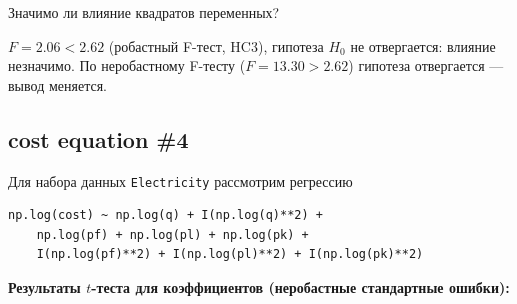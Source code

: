 \documentclass[
  russian,
]{article}
\begin{document}
Значимо ли влияние квадратов переменных?

\begin{tcolorbox}[enhanced jigsaw, arc=.35mm, bottomrule=.15mm, bottomtitle=1mm, breakable, colback=white, colbacktitle=quarto-callout-tip-color!10!white, colframe=quarto-callout-tip-color-frame, coltitle=black, left=2mm, leftrule=.75mm, opacityback=0, opacitybacktitle=0.6, rightrule=.15mm, title=\textcolor{quarto-callout-tip-color}{\faLightbulb}\hspace{0.5em}{Вывод}, titlerule=0mm, toprule=.15mm, toptitle=1mm]

\(F = 2.06 < 2.62\) (робастный F-тест, HC3), гипотеза \(H_0\) не
отвергается: влияние незначимо. По неробастному F-тесту
(\(F = 13.30 > 2.62\)) гипотеза отвергается --- вывод меняется.

\end{tcolorbox}

\subsection{cost equation \#4}\label{cost-equation-4}

Для набора данных \texttt{Electricity} рассмотрим регрессию

\begin{verbatim}
np.log(cost) ~ np.log(q) + I(np.log(q)**2) +
    np.log(pf) + np.log(pl) + np.log(pk) +
    I(np.log(pf)**2) + I(np.log(pl)**2) + I(np.log(pk)**2)
\end{verbatim}

\textbf{Результаты \(t\)-теста для коэффициентов (неробастные
стандартные ошибки):}
\end{document}
